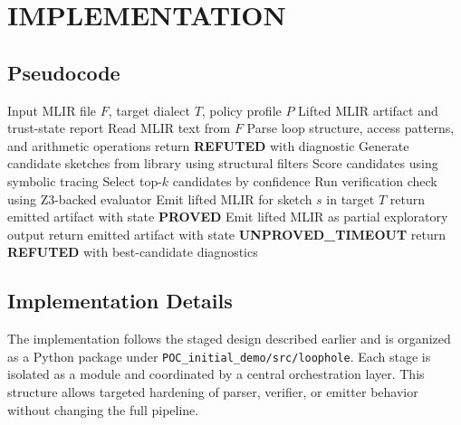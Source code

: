 \chapter{IMPLEMENTATION}
\section{Pseudocode}
\begin{algorithm}[H]
\caption{LoopHole lifting workflow}
\begin{algorithmic}[1]
\Require Input MLIR file $F$, target dialect $T$, policy profile $P$
\Ensure Lifted MLIR artifact and trust-state report
\State Read MLIR text from $F$
\State Parse loop structure, access patterns, and arithmetic operations
    \State return \textbf{REFUTED} with diagnostic
\EndIf
\State Generate candidate sketches from library using structural filters
\State Score candidates using symbolic tracing
\State Select top-$k$ candidates by confidence
    \State Run verification check using Z3-backed evaluator
        \State Emit lifted MLIR for sketch $s$ in target $T$
        \State return emitted artifact with state \textbf{PROVED}
        \State Emit lifted MLIR as partial exploratory output
        \State return emitted artifact with state \textbf{UNPROVED\_TIMEOUT}
    \EndIf
\EndFor
\State return \textbf{REFUTED} with best-candidate diagnostics
\end{algorithmic}
\end{algorithm}

\section{Implementation Details}  %
The implementation follows the staged design described earlier and is organized as a Python package under \texttt{POC\_initial\_demo/src/loophole}. Each stage is isolated as a module and coordinated by a central orchestration layer. This structure allows targeted hardening of parser, verifier, or emitter behavior without changing the full pipeline.

